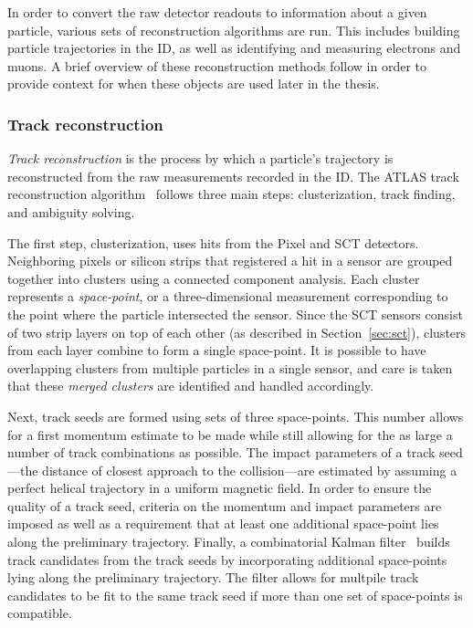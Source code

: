 In order to convert the raw detector readouts to information about a given particle, various sets of reconstruction algorithms are run.
This includes building particle trajectories in the ID, as well as identifying and measuring electrons and muons. %
A brief overview of these reconstruction methods follow in order to provide context for when these objects are used later in the thesis.

\subsubsection{Track reconstruction}\label{detector:track_reconstruction}
\emph{Track reconstruction} is the process by which a particle's trajectory is reconstructed from the raw measurements recorded in the ID.
The ATLAS track reconstruction algorithm~\cite{2017.atlas-track-reconstruction-run2} follows three main steps: clusterization, track finding, and ambiguity solving.

The first step, clusterization, uses hits from the Pixel and SCT detectors.
Neighboring pixels or silicon strips that registered a hit in a sensor are grouped together into clusters using a connected component analysis.
Each cluster represents a \emph{space-point}, or a three-dimensional measurement corresponding to the point where the particle intersected the sensor.
Since the SCT sensors consist of two strip layers on top of each other (as described in Section~\ref{sec:sct}), clusters from each layer combine to form a single space-point.
It is possible to have overlapping clusters from multiple particles in a single sensor, and care is taken that these \emph{merged clusters} are identified and handled accordingly.

Next, track seeds are formed using sets of three space-points.
This number allows for a first momentum estimate to be made while still allowing for the as large a number of track combinations as possible.
The impact parameters of a track seed---the distance of closest approach to the collision---are estimated by assuming a perfect helical trajectory in a uniform magnetic field.
In order to ensure the quality of a track seed, criteria on the momentum and impact parameters are imposed as well as a requirement that at least one additional space-point lies along the preliminary trajectory.
Finally, a combinatorial Kalman filter~\cite{1987.kalman-filtering} builds track candidates from the track seeds by incorporating additional space-points lying along the preliminary trajectory.
The filter allows for multpile track candidates to be fit to the same track seed if more than one set of space-points is compatible.

